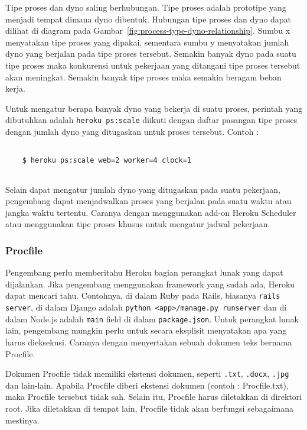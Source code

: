 Tipe proses dan dyno saling berhubungan. Tipe proses adalah prototipe yang menjadi tempat dimana dyno dibentuk. Hubungan tipe proses dan dyno dapat dilihat di diagram pada Gambar~\ref{fig:process-type-dyno-relationship}. Sumbu x menyatakan tipe proses yang dipakai, sementara sumbu y menyatakan jumlah dyno yang berjalan pada tipe proses tersebut. Semakin banyak dyno pada suatu tipe proses maka konkurensi untuk pekerjaan yang ditangani tipe proses tersebut akan meningkat. Semakin banyak tipe proses maka semakin beragam beban kerja.

Untuk mengatur berapa banyak dyno yang bekerja di suatu proses, perintah yang dibutuhkan adalah \texttt{heroku ps:scale} diikuti dengan daftar pasangan tipe proses dengan jumlah dyno yang ditugaskan untuk proses tersebut. Contoh :
\begin{lstlisting}

	$ heroku ps:scale web=2 worker=4 clock=1
	
\end{lstlisting}

Selain dapat mengatur jumlah dyno yang ditugaskan pada suatu pekerjaan, pengembang dapat menjadwalkan proses yang berjalan pada suatu waktu atau jangka waktu tertentu. Caranya dengan menggunakan add-on Heroku Scheduler atau menggunakan tipe proses khusus untuk mengatur jadwal pekerjaan.

\subsubsection{Procfile}
Pengembang perlu memberitahu Heroku bagian perangkat lunak yang dapat dijalankan. Jika pengembang menggunakan framework yang sudah ada, Heroku dapat mencari tahu. Contohnya, di dalam Ruby pada Rails, biasanya \texttt{rails server}, di dalam Django adalah \texttt{python <app>/manage.py runserver} dan di dalam Node.js adalah \texttt{main} field di dalam \texttt{package.json}. Untuk perangkat lunak lain, pengembang mungkin perlu untuk secara eksplisit menyatakan apa yang harus dieksekusi. Caranya dengan menyertakan sebuah dokumen teks bernama Procfile. 

Dokumen Procfile tidak memiliki ekstensi dokumen, seperti \texttt{.txt}, \texttt{.docx}, \texttt{.jpg} dan lain-lain. Apabila Procfile diberi ekstensi dokumen (contoh : Procfile.txt), maka Procfile tersebut tidak sah. Selain itu, Procfile harus diletakkan di direktori root. Jika diletakkan di tempat lain, Procfile tidak akan berfungsi sebagaimana mestinya.

